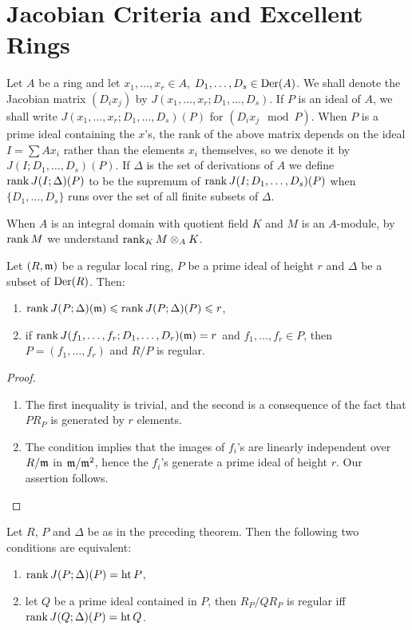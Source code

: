 \documentclass[../main]{subfiles}
\begin{document}
\section{Jacobian Criteria and Excellent Rings}\label{sec:40}
\newparagraph Let $A$ be a ring and let $x_1, \ldots, x_r \in A$, $D_1, \dots, D_s \in \operatorname{Der}(A)$. We shall denote the Jacobian matrix $(D_i x_j)$ by $J(x_1, \ldots, x_r; D_1, \ldots, D_s)$. If $P$ is an ideal of $A$, we shall write $J(x_1, \ldots, x_r; D_1, \ldots, D_s)(P)$ for $(D_i x_j \mod P)$. When $P$ is a prime ideal containing the $x$'s, the rank of the above matrix depends on the ideal $I = \sum A x_i$ rather than the elements $x_i$ themselves, so we denote it by $J(I; D_1, \ldots, D_s)(P)$. If $\Delta$ is the set of derivations of $A$ we define $\operatorname{rank} J(I; \Delta)(P)$ to be the supremum of $\operatorname{rank} J(I; D_1, \dots, D_s)(P)$ when $\{D_1, \ldots, D_s\}$ runs over the set of all finite subsets of $\Delta$. 

When $A$ is an integral domain with quotient field $K$ and $M$ is an $A$-module, by $\operatorname{rank} M$ we understand $\operatorname{rank}_K M \otimes_A K$.

\begin{theorem}\label{thm:094}
Let $(R, \mathfrak{m})$ be a regular local ring, $P$ be a prime ideal of height $r$ and $\Delta$ be a subset of $\operatorname{Der}(R)$. Then: 
\begin{enumerate}
    \item[i)] $\operatorname{rank} J(P; \Delta)(\mathfrak{m}) \leqslant \operatorname{rank} J(P; \Delta)(P) \leqslant r$,
    \item[ii)] if $\operatorname{rank} J(f_1, \dots, f_r; D_1, \dots, D_r)(\mathfrak{m}) = r$ and $f_1, \ldots, f_r \in P$, then $P = (f_1, \ldots, f_r)$ and $R/P$ is regular. 
\end{enumerate}
\end{theorem}

\begin{proof}
\begin{enumerate}[label = \roman*)]
    \item The first inequality is trivial, and the second is a consequence of the fact that $P R_P$ is generated by $r$ elements.
    \item The condition implies that the images of $f_i$'s are linearly independent over $R/\mathfrak{m}$ in $\mathfrak{m}/\mathfrak{m}^2$, hence the $f_i$'s generate a prime ideal of height $r$. Our assertion follows.
\end{enumerate}
\end{proof}

\begin{theorem}\label{thm:095}
Let $R$, $P$ and $\Delta$ be as in the preceding theorem. Then the following two conditions are equivalent: 

\begin{enumerate}[label = (\arabic*)]
    \item $\operatorname{rank} J(P; \Delta)(P) = \operatorname{ht} P$,
    \item let $Q$ be a prime ideal contained in $P$, then $R_P/QR_P$ is regular iff \newline $\operatorname{rank} J(Q; \Delta)(P) = \operatorname{ht} Q$.
\end{enumerate}
\end{theorem}
\end{document}
